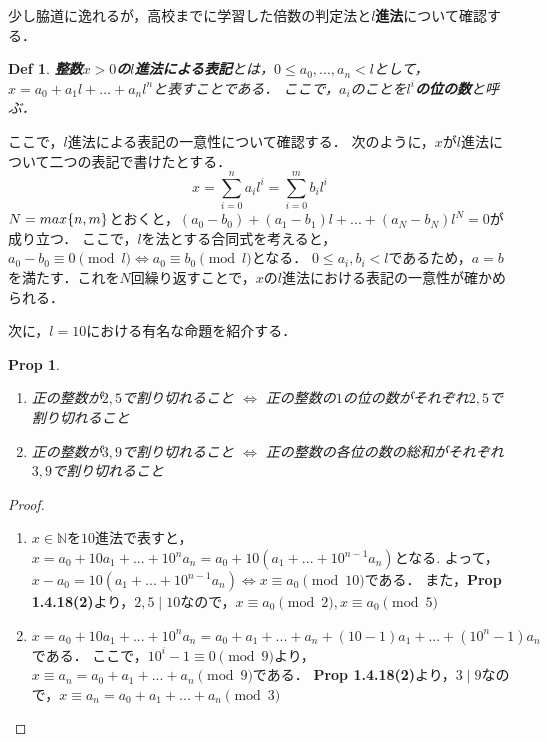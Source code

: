 \documentclass{jsarticle}
\DeclarePairedDelimiter{\cbra}{\lbrace}{\rbrace} %
\newtheorem{dfn}{Def}
\newtheorem{prop}{Prop}
\newcommand{\nat}{\mathbb{N}}
\begin{document}
    少し脇道に逸れるが，高校までに学習した倍数の判定法と\textbf{$l$進法}について確認する．

    \begin{dfn}
      \textbf{整数$x>0$の$l$進法による表記}とは，$0 \leq a_0, ... , a_n < l$として，
      $x = a_0 + a_1 l + ... + a_n l^n$と表すことである．
      ここで，$a_i$のことを\textbf{$l^i$の位の数}と呼ぶ．
    \end{dfn}

    ここで，$l$進法による表記の一意性について確認する．
    次のように，$x$が$l$進法について二つの表記で書けたとする．
    \begin{displaymath}
      x = \sum_{i=0}^{n}a_i l^i = \sum_{i=0}^{m}b_i l^i
    \end{displaymath}
    $N = max \cbra{n, m}$とおくと，$(a_0 - b_0) + (a_1 - b_1) l + ... + (a_N - b_N) l^N = 0$が成り立つ．
    ここで，$l$を法とする合同式を考えると，$a_0 - b_0 \equiv 0 \pmod l \iff a_0 \equiv b_0 \pmod l$となる．
    $0 \leq a_i, b_i < l$であるため，$a=b$を満たす．これを$N$回繰り返すことで，$x$の$l$進法における表記の一意性が確かめられる．

    次に，$l=10$における有名な命題を紹介する．

    \begin{prop}
      \begin{enumerate}
        \item 正の整数が$2,5$で割り切れること $\iff$ 正の整数の$1$の位の数がそれぞれ$2,5$で割り切れること
        \item 正の整数が$3,9$で割り切れること $\iff$ 正の整数の各位の数の総和がそれぞれ$3,9$で割り切れること
      \end{enumerate}
    \end{prop}

    \begin{proof}
      \begin{enumerate}
        \item $x \in \nat$を$10$進法で表すと，$x=a_0 + 10a_1 + ... + 10^n a_n = a_0 + 10(a_1 + ... + 10^{n-1}a_n)$となる.
        よって，$x-a_0 = 10(a_1 + ... + 10^{n-1}a_n) \iff x \equiv a_0 \pmod {10}$である．
        また，\textbf{Prop 1.4.18(2)}より，$2,5 \mid 10$なので，$x \equiv a_0 \pmod 2, x \equiv a_0 \pmod 5$
        \item $x = a_0 + 10a_1 + ... + 10^n a_n = a_0 + a_1 + ... + a_n + (10 - 1)a_1 + ... + (10^n - 1) a_n$である．
        ここで，$10^i - 1 \equiv 0 \pmod 9$より，$x \equiv a_n = a_0 + a_1 + ... + a_n \pmod 9$である．
        \textbf{Prop 1.4.18(2)}より，$3 \mid 9$なので，$x \equiv a_n = a_0 + a_1 + ... + a_n \pmod 3$
      \end{enumerate}
    \end{proof}
\end{document}
